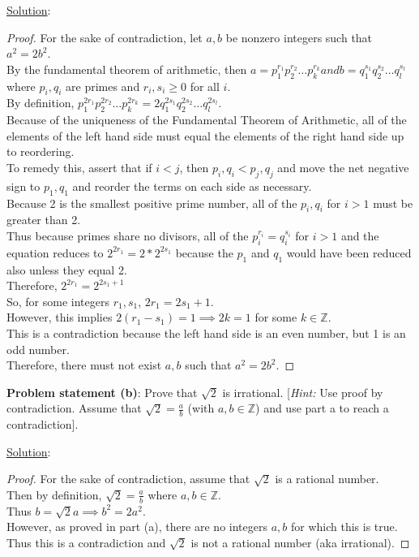 \documentclass{article} %
\begin{document}
\underline{Solution}: 
\begin{addmargin}[1em]{0em}
\begin{proof}
For the sake of contradiction, let $a, b$ be nonzero integers such that $a^2 = 2b^2$.
\\By the fundamental theorem of arithmetic, then $a = p_1^{r_1}p_2^{r_2} \ldots p_k^{r_k} and b = q_1^{s_1}q_2^{s_2} \ldots q_l^{s_l}$ where $p_i, q_i$ are primes and $r_i, s_i \geq 0$ for all $i$.
\\By definition, $p_1^{2r_1}p_2^{2r_2} \ldots p_k^{2r_k} = 2q_1^{2s_1}q_2^{2s_2} \ldots q_l^{2s_l}$.
\\Because of the uniqueness of the Fundamental Theorem of Arithmetic, all of the elements of the left hand side must equal the elements of the right hand side up to reordering.
\\To remedy this, assert that if $i < j$, then $p_i,q_i < p_j, q_j$ and move the net negative sign to $p_1, q_1$ and reorder the terms on each side as necessary.
\\Because 2 is the smallest positive prime number, all of the $p_i, q_i$ for $i > 1$ must be greater than 2.
\\Thus because primes share no divisors, all of the $p_i^{r_i} = q_i^{s_i}$ for $i > 1$ and the equation reduces to $2^{2r_1} = 2*2^{2s_1}$ because the $p_1$ and $q_1$ would have been reduced also unless they equal 2.
\\Therefore, $2^{2r_1} = 2^{2s_1 + 1}$
\\So, for some integers $r_1, s_1$, $2r_1 = 2s_1 + 1$.
\\However, this implies $2(r_1 - s_1) = 1 \implies 2k = 1$ for some $k \in \mathbb{Z}$.
\\This is a contradiction because the left hand side is an even number, but 1 is an odd number.
\\Therefore, there must not exist $a, b$ such that $a^2 = 2b^2$.
\end{proof}
\end{addmargin}

\hfill \break 

\textbf{Problem statement (b)}:  Prove that $\sqrt{2}$ is irrational.  [\textit{Hint:} Use proof by contradiction.  Assume that $\sqrt{2} = \frac{a}{b}$ (with $a,b \in \mathbb{Z}$) and use part {a} to reach a contradiction].

\underline{Solution}: 
\begin{addmargin}[1em]{0em}
\begin{proof}
For the sake of contradiction, assume that $\sqrt{2}$ is a rational number.
\\Then by definition, $\sqrt{2} = \frac{a}{b}$ where $a,b \in \mathbb{Z}$.
\\Thus $b = \sqrt{2}a \implies b^2 = 2a^2$.
\\However, as proved in part (a), there are no integers $a, b$ for which this is true.
\\Thus this is a contradiction and $\sqrt{2}$ is not a rational number (aka irrational).
\end{proof}
\end{addmargin}

\newpage
\end{document}
